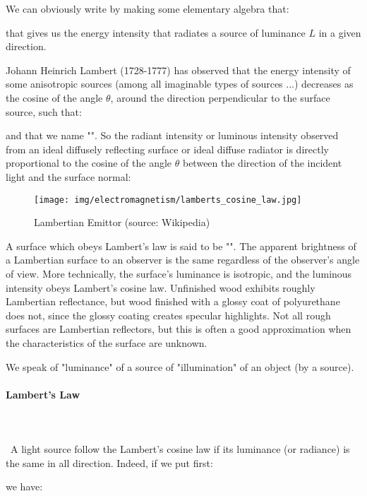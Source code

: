 	We can obviously write by making some elementary algebra that:
	
	that gives us the energy intensity that radiates a source of luminance $L$ in a given direction.

	Johann Heinrich Lambert (1728-1777) has observed that the energy intensity of some anisotropic sources (among all imaginable types of sources ...) decreases as the cosine of the angle $\theta$, around the direction perpendicular to the surface source, such that:
 	
	and that we name "". So  the radiant intensity or luminous intensity observed from an ideal diffusely reflecting surface or ideal diffuse radiator is directly proportional to the cosine of the angle $\theta$ between the direction of the incident light and the surface normal:
	\begin{figure}[H]
		\centering
		\texttt{[image: img/electromagnetism/lamberts\_cosine\_law.jpg]}
		\caption[Lambertian Emittor]{Lambertian Emittor (source: Wikipedia)}
	\end{figure}
	A surface which obeys Lambert's law is said to be "". The apparent brightness of a Lambertian surface to an observer is the same regardless of the observer's angle of view. More technically, the surface's luminance is isotropic, and the luminous intensity obeys Lambert's cosine law. Unfinished wood exhibits roughly Lambertian reflectance, but wood finished with a glossy coat of polyurethane does not, since the glossy coating creates specular highlights. Not all rough surfaces are Lambertian reflectors, but this is often a good approximation when the characteristics of the surface are unknown.
	\begin{tcolorbox}[title=Remark,colframe=black,arc=10pt]
	We speak of "luminance" of a source of "illumination" of an object (by a source).
	\end{tcolorbox}
	
	\pagebreak
	\paragraph{Lambert's Law}\mbox{}\\\\\
	A light source follow the Lambert's cosine law if its luminance (or radiance) is the same in all direction. Indeed, if we put first:
	
	we have:
	
